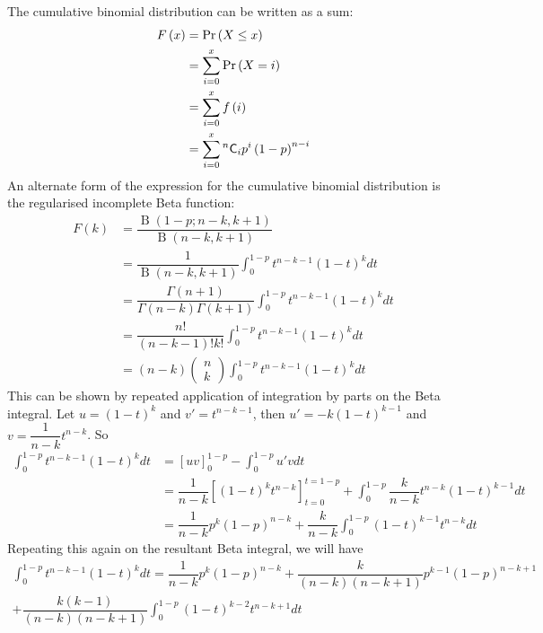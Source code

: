 \documentclass[11pt]{report} %
\begin{document}
The cumulative binomial distribution can be written as a sum:
\begin{align}
F\left(x\right) &= \operatorname{Pr}\left(X \leq x\right) \\
&= \sum_{i = 0}^{x}\operatorname{Pr}\left(X = i\right) \\
&= \sum_{i = 0}^{x}f\left(i\right) \\
&= \sum_{i = 0}^{x}\mathstrut^{n}\mathsf{C}_{i}p^{i}\left(1 - p\right)^{n - i}
\end{align}
An alternate form of the expression for the cumulative binomial distribution is the regularised incomplete Beta function:
\begin{align}
F\left(k\right) &= \dfrac{\operatorname{B}\left(1 - p; n - k, k + 1\right)}{\operatorname{B}\left(n - k, k + 1\right)} \\
&= \dfrac{1}{\operatorname{B}\left(n - k, k + 1\right)}\int_{0}^{1 - p}t^{n - k - 1}\left(1 - t\right)^{k}dt \\
&= \dfrac{\Gamma\left(n + 1\right)}{\Gamma\left(n - k\right)\Gamma\left(k + 1\right)}\int_{0}^{1 - p}t^{n - k - 1}\left(1 - t\right)^{k}dt \\
&= \dfrac{n!}{\left(n - k - 1\right)!k!}\int_{0}^{1 - p}t^{n - k - 1}\left(1 - t\right)^{k}dt \\
&= \left(n - k\right)\begin{pmatrix}n \\ k\end{pmatrix}\int_{0}^{1 - p}t^{n - k - 1}\left(1 - t\right)^{k}dt
\end{align}
This can be shown by repeated application of integration by parts on the Beta integral. Let $u = \left(1 - t\right)^{k}$ and $v' = t^{n - k - 1}$, then $u' = -k\left(1 - t\right)^{k - 1}$ and $v = \dfrac{1}{n - k}t^{n - k}$. So
\begin{align}
\int_{0}^{1 - p}t^{n - k - 1}\left(1 - t\right)^{k}dt &= \left[uv\right]_{0}^{1 - p} - \int_{0}^{1 - p}u'vdt \\
&= \dfrac{1}{n - k}\left[\left(1 - t\right)^{k}t^{n - k}\right]_{t = 0}^{t = 1 - p} + \int_{0}^{1 - p}\dfrac{k}{n - k}t^{n - k}\left(1 - t\right)^{k - 1}dt \\
&= \dfrac{1}{n - k}p^{k}\left(1 - p\right)^{n - k} + \dfrac{k}{n - k}\int_{0}^{1 - p}\left(1 - t\right)^{k - 1}t^{n - k}dt
\end{align}
Repeating this again on the resultant Beta integral, we will have
\begin{multline}
\int_{0}^{1 - p}t^{n - k - 1}\left(1 - t\right)^{k}dt = \dfrac{1}{n - k}p^{k}\left(1 - p\right)^{n - k} + \dfrac{k}{\left(n - k\right)\left(n - k + 1\right)}p^{k - 1}\left(1 - p\right)^{n - k + 1} \\
 + \dfrac{k\left(k - 1\right)}{\left(n - k\right)\left(n - k + 1\right)}\int_{0}^{1 - p}\left(1 - t\right)^{k - 2}t^{n - k + 1}dt
\end{multline}
\end{document}
